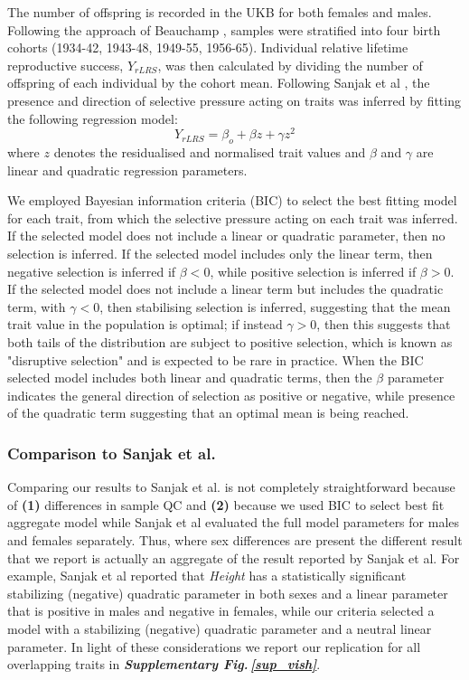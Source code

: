 \documentclass[12pt]{zHenriquesLab-StyleBioRxiv}
\newcommand\sref[1]{\normalsize{\textbf{\textit{Supplementary Fig.\,\ref{#1}}}}\normalsize{}}
\begin{document}
{{The number of offspring is recorded in the UKB for both females and
males. Following the approach of Beauchamp \cite{v_select2}, samples were 
stratified into four birth cohorts (1934-42, 1943-48, 1949-55, 1956-65). Individual relative
lifetime reproductive success, $Y_{rLRS}$, was then calculated by
dividing the number of offspring of each individual by the cohort
mean. Following Sanjak et al \cite{Sanjak2018}, the presence and
direction of selective pressure acting on traits was inferred by
fitting the following regression model:
\begin{equation}
Y_{rLRS} = \beta_o + \beta z + \gamma z^2 \label{math:LRS}
\end{equation}
where $z$ denotes the residualised and normalised trait values and
$\beta$ and $\gamma$ are linear and quadratic regression parameters.

We employed Bayesian information criteria (BIC) to select the best
fitting model for each trait, from which the selective pressure acting
on each trait was inferred. If the selected model does not include a linear
or quadratic parameter, then no selection is inferred. If the selected model
includes only the linear term, then negative selection is inferred if $\beta<0$, 
while positive selection is inferred if $\beta>0$. If the selected model does not 
include a linear term but includes the quadratic term, with $\gamma<0$, then 
stabilising selection is inferred, suggesting that the mean trait value in the 
population is optimal; if instead $\gamma>0$, then this suggests that 
both tails of the distribution are subject to positive selection, which is known as 
"disruptive selection" and is expected to be rare in practice. When the BIC selected 
model includes both linear and quadratic terms, then the $\beta$ parameter indicates 
the general direction of selection as positive or negative, while presence of the quadratic 
term suggesting that an optimal mean is being reached.

{\color{blue}
\subsubsection*{Comparison to Sanjak et al.} 


Comparing our results to Sanjak et al. \cite{Sanjak2018} is not completely straightforward because of \textbf{(1)} differences in sample QC 
and \textbf{(2)} because we used BIC to select best fit aggregate model while Sanjak et al \cite{Sanjak2018} evaluated the 
full model parameters for males and females separately.  Thus, where sex differences are present the 
different result that we report is actually an aggregate of the result reported by Sanjak et al.  For example, Sanjak et al 
reported that \textit{Height} has a statistically significant stabilizing (negative) quadratic parameter in both sexes and 
a linear parameter that is positive in males and negative in females, while our criteria selected a model with a 
stabilizing (negative) quadratic parameter and a neutral linear parameter.  In light of these considerations 
we report our replication for all overlapping traits in \sref{sup_vish}. 
}


}}
\end{document}
